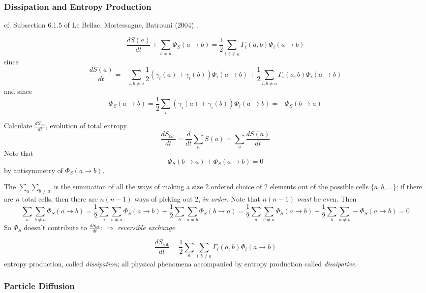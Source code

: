\documentclass[10pt]{amsart}
\begin{document}
\begin{multicols*}{2}
\subsubsection{Dissipation and Entropy Production}

cf. Subsection 6.1.5 of Le Bellac, Mortessagne, Batrouni (2004) \cite{MLeBellacFMortessagneGBatrouni2004}. 





\begin{equation}
  \frac{dS(a)}{dt} + \sum_{b\neq a} \Phi_S(a\to b) = \frac{1}{2} \sum_{i,b\neq a} \Gamma_i(a,b) \Phi_i(a\to b)
\end{equation}
since 
\[
\frac{dS(a)}{dt} = -\sum_{i,b\neq a} \frac{1}{2} ( \gamma_i(a) + \gamma_i(b)) \Phi_i(a\to b) + \frac{1}{2} \sum_{i,b\neq a} \Gamma_i(a,b) \Phi_i(a\to b)
\]
and since
\begin{equation}
\Phi_S(a\to b) = \frac{1}{2} \sum_i (\gamma_i(a) + \gamma_i(b))\Phi_i(a\to b) = -\Phi_S(b\to a)
\end{equation}

Calculate $\frac{dS_{\text{tot}}}{dt}$, evolution of total entropy.  
\[
\frac{dS_{\text{tot}}}{dt} = \frac{d}{dt} \sum_a S(a) = \sum_a \frac{dS(a)}{dt}
\]
Note that 
\[
\Phi_S(b\to a) + \Phi_S(a\to b) = 0 
\]
by antisymmetry of $\Phi_S(a\to b)$. 

The $\sum_a \sum_{b\neq a}$ is the summation of all the ways of making a size 2 ordered choice of 2 elements out of the possible cells $\lbrace a, b, \dots \rbrace$; if there are $n$ total cells, then there are $n(n-1)$ ways of picking out 2, \emph{in order}.  Note that $n(n-1)$ \emph{must} be even.  Then
\[
\sum_a \sum_{b\neq a} \Phi_S(a\to b) = \frac{1}{2} \sum_a \sum_{b\neq a} \Phi_S(a\to b) + \frac{1}{2} \sum_b \sum_{a\neq b} \Phi_S(b\to a) = \frac{1}{2} \sum_a \sum_{b\neq a} \Phi_S(a\to b) + \frac{1}{2} \sum_b \sum_{a\neq b} - \Phi_S(a\to b) = 0 
\]
So $\Phi_S$ doesn't contribute to $\frac{d S_{\text{tot}}}{dt}$: $\Longrightarrow $ \emph{reversible exchange}

\[
\frac{dS_{\text{tot}}}{dt} = \frac{1}{2} \sum_a \sum_{i,b\neq a} \Gamma_i(a,b) \Phi_i(a\to b)
\]
entropy production, called \emph{dissipation}; all physical phenomena accompanied by entropy production called \emph{dissipative}.  





\subsubsection{Particle Diffusion}


\end{multicols*}
\end{document}
